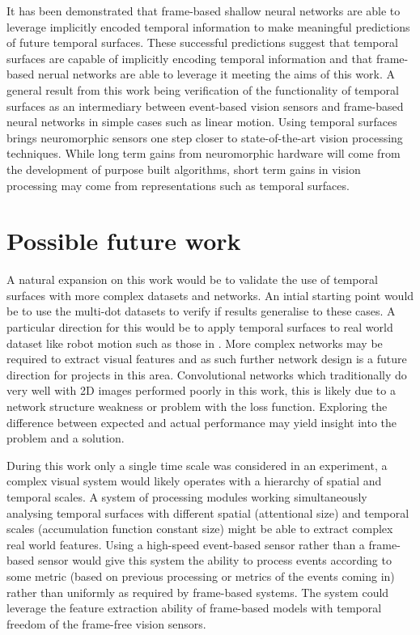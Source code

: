 It has been demonstrated that frame-based shallow neural networks are able to leverage implicitly encoded temporal information to make meaningful predictions of future temporal surfaces. 
These successful predictions suggest that temporal surfaces are capable of implicitly encoding temporal information and that frame-based nerual networks are able to leverage it meeting the aims of this work. 
A general result from this work being verification of the functionality of temporal surfaces as an intermediary between event-based vision sensors and frame-based neural networks in simple cases such as linear motion. 
Using temporal surfaces brings neuromorphic sensors one step closer to state-of-the-art vision processing techniques. 
While long term gains from neuromorphic hardware will come from the development of purpose built algorithms, short term gains in vision processing may come from representations such as temporal surfaces.  


\section{Possible future work}
A natural expansion on this work would be to validate the use of temporal surfaces with more complex datasets and networks. 
An intial starting point would be to use the multi-dot datasets to verify if results generalise to these cases.
A particular direction for this would be to apply temporal surfaces to real world dataset like robot motion such as those in \cite{Gibson2014, barranco2016dataset}. 
More complex networks may be required to extract visual features and as such further network design is a future direction for projects in this area. 
Convolutional networks which traditionally do very well with 2D images performed poorly in this work, this is likely due to a network structure weakness or problem with the loss function. 
Exploring the difference between expected and actual performance may yield insight into the problem and a solution. 

During this work only a single time scale was considered in an experiment, a complex visual system would likely operates with a hierarchy of spatial and temporal scales.
A system of processing modules working simultaneously analysing temporal surfaces with different spatial (attentional size) and temporal scales (accumulation function constant size) might be able to extract complex real world features. 
Using a high-speed event-based sensor rather than a frame-based sensor would give this system the ability to process events according to some metric (based on previous processing or metrics of the events coming in) rather than uniformly as required by frame-based systems. 
The system could leverage the feature extraction ability of frame-based models with temporal freedom of the frame-free vision sensors.









